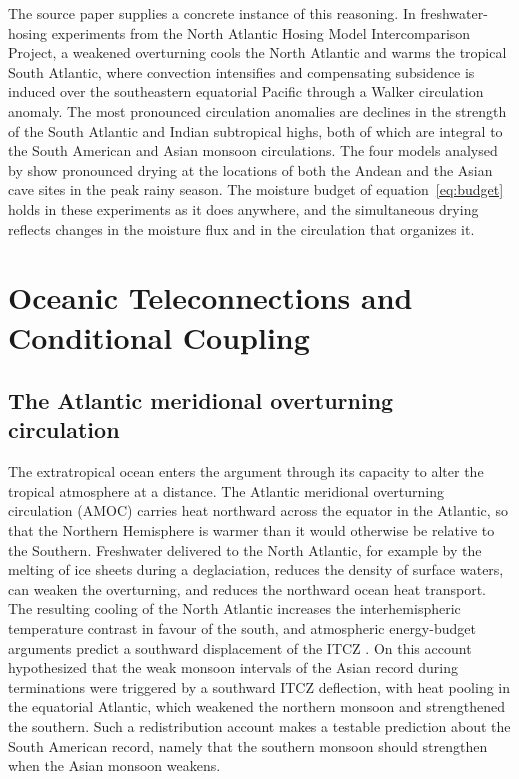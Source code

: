 \documentclass[11pt]{article}
\theoremstyle{definition}
\begin{document}
The source paper supplies a concrete instance of this reasoning. In freshwater-hosing experiments from the North Atlantic Hosing Model Intercomparison Project, a weakened overturning cools the North Atlantic and warms the tropical South Atlantic, where convection intensifies and compensating subsidence is induced over the southeastern equatorial Pacific through a Walker circulation anomaly. The most pronounced circulation anomalies are declines in the strength of the South Atlantic and Indian subtropical highs, both of which are integral to the South American and Asian monsoon circulations. The four models analysed by \citeauthor{olson2026} show pronounced drying at the locations of both the Andean and the Asian cave sites in the peak rainy season. The moisture budget of equation~\eqref{eq:budget} holds in these experiments as it does anywhere, and the simultaneous drying reflects changes in the moisture flux and in the circulation that organizes it.

\section{Oceanic Teleconnections and Conditional Coupling}

\subsection{The Atlantic meridional overturning circulation}

The extratropical ocean enters the argument through its capacity to alter the tropical atmosphere at a distance. The Atlantic meridional overturning circulation (AMOC) carries heat northward across the equator in the Atlantic, so that the Northern Hemisphere is warmer than it would otherwise be relative to the Southern. Freshwater delivered to the North Atlantic, for example by the melting of ice sheets during a deglaciation, reduces the density of surface waters, can weaken the overturning, and reduces the northward ocean heat transport. The resulting cooling of the North Atlantic increases the interhemispheric temperature contrast in favour of the south, and atmospheric energy-budget arguments predict a southward displacement of the ITCZ \citep{schneider2014}. On this account \citet{cheng2016} hypothesized that the weak monsoon intervals of the Asian record during terminations were triggered by a southward ITCZ deflection, with heat pooling in the equatorial Atlantic, which weakened the northern monsoon and strengthened the southern. Such a redistribution account makes a testable prediction about the South American record, namely that the southern monsoon should strengthen when the Asian monsoon weakens.
\end{document}
